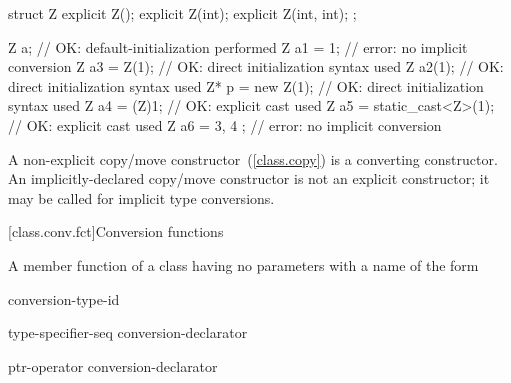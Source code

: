 \begin{codeblock}
struct Z {
  explicit Z();
  explicit Z(int);
  explicit Z(int, int);
};

Z a;                            // OK: default-initialization performed
Z a1 = 1;                       // error: no implicit conversion
Z a3 = Z(1);                    // OK: direct initialization syntax used
Z a2(1);                        // OK: direct initialization syntax used
Z* p = new Z(1);                // OK: direct initialization syntax used
Z a4 = (Z)1;                    // OK: explicit cast used
Z a5 = static_cast<Z>(1);       // OK: explicit cast used
Z a6 = { 3, 4 };                // error: no implicit conversion
\end{codeblock}
\exitexample
\exitnote

\pnum
A
non-explicit
copy/move constructor~(\ref{class.copy}) is a converting constructor.
\enternote
An implicitly-declared copy/move constructor is not an explicit constructor;
it may be called for implicit type conversions.
\exitnote

[class.conv.fct]{Conversion functions}%
%
%
%

\pnum
A member function of a class  having no parameters with a name of the form

\begin{bnf}
\br
     conversion-type-id
\end{bnf}

\begin{bnf}
\br
    type-specifier-seq conversion-declarator\opt
\end{bnf}

\begin{bnf}
\br
    ptr-operator conversion-declarator\opt
\end{bnf}

